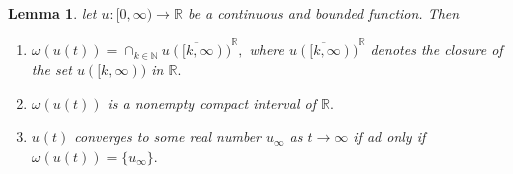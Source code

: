 \documentclass[10pt,a4paper]{amsart}
\newtheorem{lemma}{Lemma}
\begin{document}
\begin{lemma}
\label{l2}
let $u:[0,\infty )\to \mathbb{R}$ be a continuous and bounded
function. Then
\begin{enumerate}
\item $\omega (u(t))=\cap _{k\in \mathbb{N}}\overline{u([k,\infty ))}^{\mathbb{R}%
},$ where $\overline{u([k,\infty ))}^{\mathbb{R}}$ denotes the closure of
the set $u([k,\infty ))$ in $\mathbb{R}.$
\item $\omega (u(t))$ is a nonempty compact interval of $\mathbb{R}.$
\item $u(t)$ converges to some real number $u_{\infty }$ as $%
t\rightarrow \infty $ if ad only if $\omega (u(t))=\{u_{\infty }\}.$
\end{enumerate}
\end{lemma}
\end{document}
